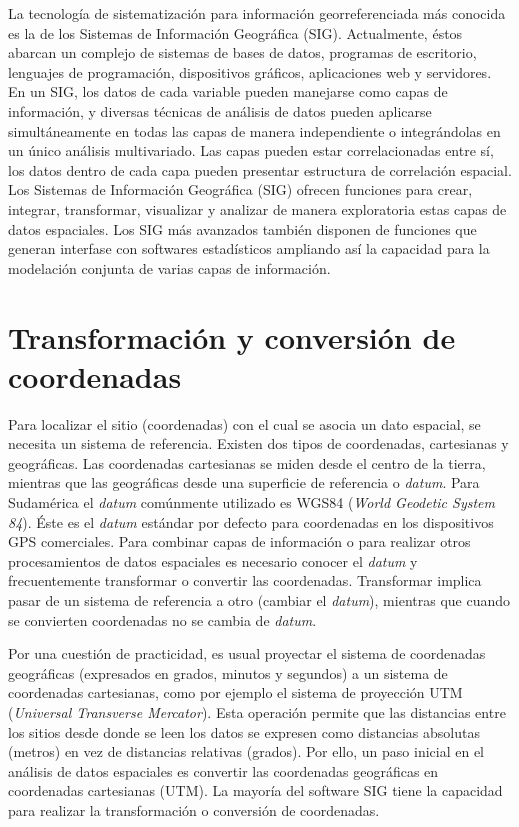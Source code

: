 \documentclass[11pt,b5paper,]{krantz}
\begin{document}
La tecnología de sistematización para información georreferenciada más
conocida es la de los Sistemas de Información Geográfica (SIG).
Actualmente, éstos abarcan un complejo de sistemas de bases de datos,
programas de escritorio, lenguajes de programación, dispositivos
gráficos, aplicaciones web y servidores. En un SIG, los datos de cada
variable pueden manejarse como capas de información, y diversas técnicas
de análisis de datos pueden aplicarse simultáneamente en todas las capas
de manera independiente o integrándolas en un único análisis
multivariado. Las capas pueden estar correlacionadas entre sí, los datos
dentro de cada capa pueden presentar estructura de correlación espacial.
Los Sistemas de Información Geográfica (SIG) ofrecen funciones para
crear, integrar, transformar, visualizar y analizar de manera
exploratoria estas capas de datos espaciales. Los SIG más avanzados
también disponen de funciones que generan interfase con softwares
estadísticos ampliando así la capacidad para la modelación conjunta de
varias capas de información.

\section{Transformación y conversión de
coordenadas}\label{transformaciuxf3n-y-conversiuxf3n-de-coordenadas}

Para localizar el sitio (coordenadas) con el cual se asocia un dato
espacial, se necesita un sistema de referencia. Existen dos tipos de
coordenadas, cartesianas y geográficas. Las coordenadas cartesianas se
miden desde el centro de la tierra, mientras que las geográficas desde
una superficie de referencia o \emph{datum}. Para Sudamérica el
\emph{datum} comúnmente utilizado es WGS84 (\emph{World Geodetic System
84}). Éste es el \emph{datum} estándar por defecto para coordenadas en
los dispositivos GPS comerciales. Para combinar capas de información o
para realizar otros procesamientos de datos espaciales es necesario
conocer el \emph{datum} y frecuentemente transformar o convertir las
coordenadas. Transformar implica pasar de un sistema de referencia a
otro (cambiar el \emph{datum}), mientras que cuando se convierten
coordenadas no se cambia de \emph{datum}.

Por una cuestión de practicidad, es usual proyectar el sistema de
coordenadas geográficas (expresados en grados, minutos y segundos) a un
sistema de coordenadas cartesianas, como por ejemplo el sistema de
proyección UTM (\emph{Universal Transverse Mercator}). Esta operación
permite que las distancias entre los sitios desde donde se leen los
datos se expresen como distancias absolutas (metros) en vez de
distancias relativas (grados). Por ello, un paso inicial en el análisis
de datos espaciales es convertir las coordenadas geográficas en
coordenadas cartesianas (UTM). La mayoría del software SIG tiene la
capacidad para realizar la transformación o conversión de coordenadas.
\end{document}
